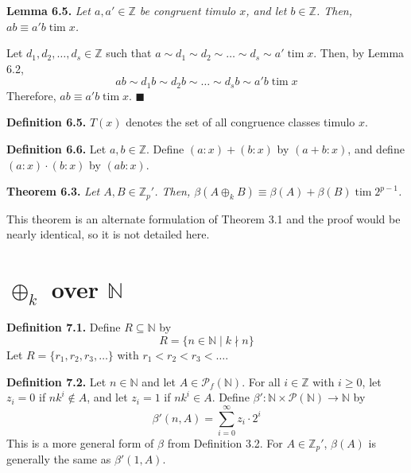 \documentclass{article}
\newcommand{\tim}{\;\text{tim}\;}
\newcommand{\zee}{\mathbb{Z}}
\newcommand{\N}{\mathbb{N}}
\begin{document}
\textbf{Lemma 6.5.} \textit{Let $a, a' \in \zee$ be
congruent timulo $x$, and let $b \in \zee$. Then,
$ab \equiv a'b \tim x$.}

Let $d_1, d_2, \ldots, d_s \in \zee$
such that $a \sim d_1 \sim d_2 \sim \ldots \sim d_s \sim a' \tim x$.
Then, by Lemma 6.2,
\[ab \sim d_1b \sim d_2b \sim \ldots
\sim d_sb \sim a'b \tim x\]
Therefore, $ab \equiv a'b \tim x$.
$\blacksquare$

\textbf{Definition 6.5.} $T(x)$ denotes the set of all
congruence classes timulo $x$.

\textbf{Definition 6.6.} Let $a, b \in \zee$. Define
$(a:x) + (b:x)$ by $(a+b:x)$, and define $(a:x) \cdot (b:x)$
by $(ab:x)$.

\textbf{Theorem 6.3.} \textit{Let $A, B \in \zee_p'$.
Then, $\beta(A \oplus_k B) \equiv \beta(A) + \beta(B) \tim 2^{p-1}$.}

This theorem is an alternate formulation of Theorem 3.1 and the proof
would be nearly identical, so it is not detailed here.

\section{$\oplus_k$ over $\N$}

\textbf{Definition 7.1.} Define $R \subseteq \N$ by
\[R = \{n \in \N \mid k \nmid n\}\]
Let $R = \{r_1, r_2, r_3, \ldots\}$ with $r_1 < r_2 < r_3 < \ldots$.

\textbf{Definition 7.2.} Let $n \in \N$ and let $A \in \mathcal{P}_f(\N)$.
For all $i \in \zee$
with $i \geq 0$, let $z_i = 0$ if $nk^i \not\in A$,
and let $z_i = 1$ if $nk^i \in A$.
Define $\beta': \N \times \mathcal{P}(\N) \rightarrow \N$
by
\[\beta'(n, A) = \sum_{i = 0}^\infty z_i \cdot 2^{i}\]
This is a more general form of $\beta$ from Definition 3.2.
For $A \in \zee_p'$, $\beta(A)$ is generally
the same as $\beta'(1, A)$.
\end{document}
